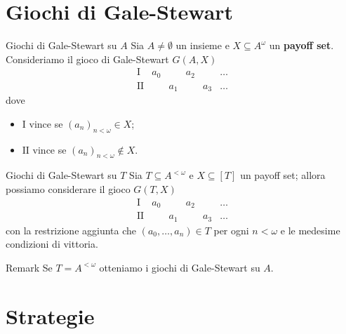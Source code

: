 \documentclass[aspectratio=43]{beamer}
\begin{document}
\section{Giochi di Gale-Stewart}

\begin{frame}{Giochi di Gale-Stewart su \(A\)}
  Sia \(A \neq \emptyset\) un insieme e \(X \subseteq A^\omega\) un \textbf{payoff set}.
  Consideriamo il gioco di Gale-Stewart \(G(A, X)\)
  \begin{equation*}
    \begin{matrix}
      \mathrm{I} & a_0 & & a_2 & & \ldots\\
      \mathrm{II} & & a_1 & & a_3 & \ldots
    \end{matrix}
  \end{equation*}
  \pause
  dove
  \begin{itemize}
  \item \(\mathrm{I}\) vince se \((a_n)_{n < \omega} \in X\);
  \item \(\mathrm{II}\) vince se \((a_n)_{n < \omega} \not\in X\).
  \end{itemize}
\end{frame}

\begin{frame}{Giochi di Gale-Stewart su \(T\)}
  Sia \(T \subseteq A^{<\omega}\) e \(X\subseteq [T]\) un payoff set; allora possiamo considerare il gioco \(G(T, X)\)
  \begin{equation*}
    \begin{matrix}
      \mathrm{I} & a_0 & & a_2 & & \ldots\\
      \mathrm{II} & & a_1 & & a_3 & \ldots
    \end{matrix}
  \end{equation*}
  con la restrizione aggiunta che \((a_0, \ldots, a_n) \in T\) per ogni \(n < \omega\) e le medesime condizioni di vittoria.
  \pause
  \begin{block}{Remark}
    Se \(T = A^{<\omega}\) otteniamo i giochi di Gale-Stewart su \(A\).
  \end{block}
\end{frame}

\section{Strategie}
\end{document}
